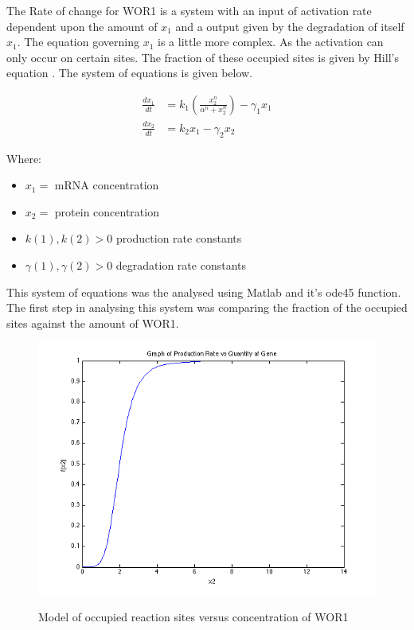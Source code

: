 \documentclass[]{article}
\begin{document}
The Rate of change for WOR1 is a system with an input of activation rate dependent upon the amount of $x_1$ and a output given by the degradation of itself $x_1$. The equation governing $x_1$ is a little more complex. As the activation can only occur on certain sites. The fraction of these occupied sites is given by Hill's equation \cite{Hill}. The system of equations is given below.

\begin{align}
\frac{dx_1}{dt} &= k_1\left(\frac{x_2^n}{\alpha^n + x_2^n}\right) - \gamma_1x_1\\
\frac{dx_2}{dt} &= k_2x_1 -\gamma_2x_2
\end{align}

Where:
\begin{itemize}
	\item $x_1 =$ mRNA concentration
	\item $x_2 =$ protein concentration
	\item $k(1), k(2) > 0$ production rate constants
	\item $\gamma(1), \gamma(2) > 0$ degradation rate constants
\end{itemize}


This system of equations was the analysed using Matlab and it's ode45 function. The first step in analysing this system was comparing the fraction of the occupied sites against the amount of WOR1. 

\begin{figure}[h]
\caption{Model of occupied reaction sites versus concentration of WOR1}
\centering
\includegraphics[scale = 0.5]{prodRateVsQuant.png}
\label{fig:Hill}
\end{figure}
\end{document}

